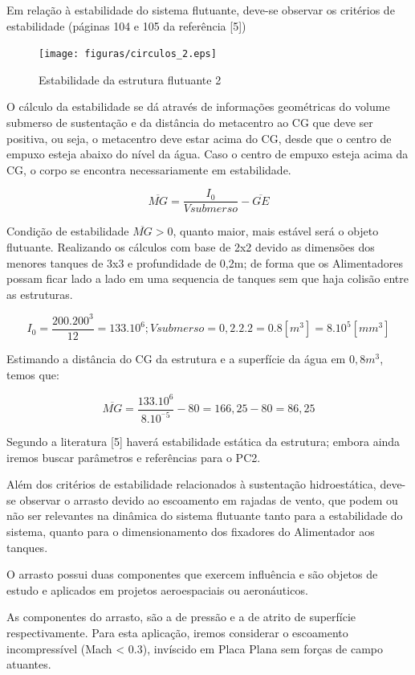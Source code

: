 Em relação à estabilidade do sistema flutuante, deve-se observar os critérios de estabilidade (páginas 104 e 105 da referência [5])

\begin{figure}[H]
 \centering
   \texttt{[image: figuras/circulos\_2.eps]}
 \caption{Estabilidade da estrutura flutuante 2}
 \label{estabilidade2}
\end{figure}

O cálculo da estabilidade se dá através de informações geométricas do volume submerso de sustentação e da distância do metacentro ao CG que deve ser positiva, ou seja, o metacentro deve estar acima do CG, desde que o centro de empuxo esteja abaixo do nível da água. Caso o centro de empuxo esteja acima da CG, o corpo se encontra necessariamente em estabilidade.

\[\overline{MG} = \frac{I_{0}}{Vsubmerso} - \overline{GE}\]

Condição de estabilidade $\overline{MG} > 0$, quanto maior, mais estável será o objeto flutuante.
Realizando os cálculos com base de 2x2 devido as dimensões dos menores tanques de 3x3 e profundidade de 0,2m; de forma que os Alimentadores possam ficar lado a lado em uma sequencia de tanques sem que haja colisão entre as estruturas.

\[I_{0} = \frac{200.200^3}{12} = 133.10^6 ;Vsubmerso = 0,2.2.2 = 0.8[m^3] = 8.10^5[mm^3]\]

Estimando a distância do CG da estrutura e a superfície da água em $0,8m^3$, temos que:

\[\overline{MG} = \frac{133.10^6}{8.10^{^-5}} - 80=166,25 -80 =86,25\]

Segundo a literatura [5] haverá estabilidade estática da estrutura; embora ainda iremos buscar parâmetros e referências para o PC2.

Além dos critérios de estabilidade relacionados à sustentação hidroestática, deve-se observar o arrasto devido ao escoamento em rajadas de vento, que podem ou não ser relevantes na dinâmica do sistema flutuante tanto para a estabilidade do sistema, quanto para o dimensionamento dos fixadores do Alimentador aos tanques.

O arrasto possui duas componentes que exercem influência e são objetos de estudo e aplicados em projetos aeroespaciais ou aeronáuticos.

As componentes do arrasto, são a de pressão e a de atrito de superfície respectivamente. Para esta aplicação, iremos considerar o escoamento incompressível (Mach < 0.3), invíscido em Placa Plana sem forças de campo atuantes.

